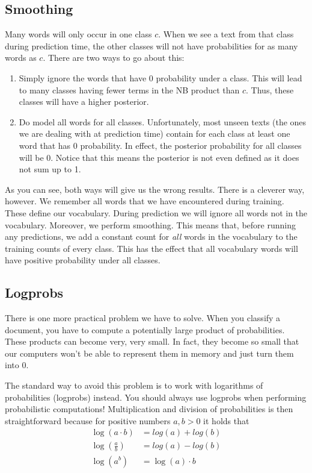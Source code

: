 \documentclass[11pt, a4paper]{article}
\begin{document}
\subsection{Smoothing}

Many words will only occur in one class $ c $. When we see a text from that class during prediction time, the
other classes will not have probabilities for as many words as $ c $. There are two ways to go about this:
\begin{enumerate}
\item Simply ignore the words that have 0 probability under a class. This will lead to many classes
having fewer terms in the NB product than $ c $. Thus, these classes will have a higher posterior.
\item Do model all words for all classes. Unfortunately, most unseen texts (the ones we are dealing
with at prediction time) contain for each class at least one word that has 0 probability. In effect, the
posterior probability for all classes will be 0. Notice that this means the posterior is not even defined
as it does not sum up to 1.
\end{enumerate} 

As you can see, both ways will give us the wrong results. There is a cleverer way, however. We remember
all words that we have encountered during training. These define our vocabulary. During prediction we
will ignore all words not in the vocabulary. Moreover, we perform smoothing. This means that, before running any predictions, we add a constant count for \textit{all} words in the vocabulary to the training counts
of every class. This has the effect that all vocabulary words will have positive probability under
all classes. 

\subsection{Logprobs}

There is one more practical problem we have to solve. When you classify a document, you have to compute a potentially large product of probabilities. These products can become very, very small. In fact, they become so small that our computers won't be able to 
represent them in memory and just turn them into 0.

The standard way to avoid this problem is to work with logarithms of probabilities (logprobs) instead. You should always use logprobs when performing
probabilistic computations! Multiplication and division of probabilities is then straightforward because for positive numbers $ a,b > 0 $ it holds that
\begin{align*}
\log(a \cdot b) &= log(a) + log(b) \\
\log\left( \frac{a}{b} \right) &= log(a) - log(b) \\
\log\left( a^{b} \right) &= \log(a) \cdot b
\end{align*}
\end{document}
